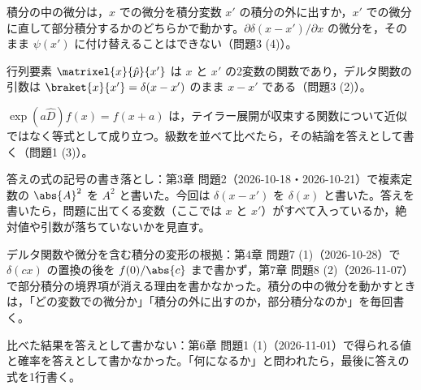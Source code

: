 \documentclass[uplatex,dvipdfmx,a4paper,11pt]{jsarticle}
\begin{document}
\matome
\begin{saitenichiran}
\end{saitenichiran}
\begin{daiji}
  \item 積分の中の微分は，$x$ での微分を積分変数 $x'$ の積分の外に出すか，$x'$ での微分に直して部分積分するかのどちらかで動かす。$\partial\delta(x-x')/\partial x$ の微分を，そのまま $\psi(x')$ に付け替えることはできない（問題3 (4)）。
  \item 行列要素 $\matrixel{x}{\hat{p}}{x'}$ は $x$ と $x'$ の2変数の関数であり，デルタ関数の引数は $\braket{x}{x'}=\delta(x-x')$ のまま $x-x'$ である（問題3 (2)）。
  \item $\exp(a\hat{D})f(x)=f(x+a)$ は，テイラー展開が収束する関数について近似ではなく等式として成り立つ。級数を並べて比べたら，その結論を答えとして書く（問題1 (3)）。
\end{daiji}
\begin{maemo}
  \item 答えの式の記号の書き落とし：第3章 問題2（2026-10-18・2026-10-21）で複素定数の $\abs{A}^{2}$ を $A^{2}$ と書いた。今回は $\delta(x-x')$ を $\delta(x)$ と書いた。答えを書いたら，問題に出てくる変数（ここでは $x$ と $x'$）がすべて入っているか，絶対値や引数が落ちていないかを見直す。
  \item デルタ関数や微分を含む積分の変形の根拠：第4章 問題7 (1)（2026-10-28）で $\delta(cx)$ の置換の後を $f(0)/\abs{c}$ まで書かず，第7章 問題8 (2)（2026-11-07）で部分積分の境界項が消える理由を書かなかった。積分の中の微分を動かすときは，「どの変数での微分か」「積分の外に出すのか，部分積分なのか」を毎回書く。
  \item 比べた結果を答えとして書かない：第6章 問題1 (1)（2026-11-01）で得られる値と確率を答えとして書かなかった。「何になるか」と問われたら，最後に答えの式を1行書く。
\end{maemo}
\end{document}
